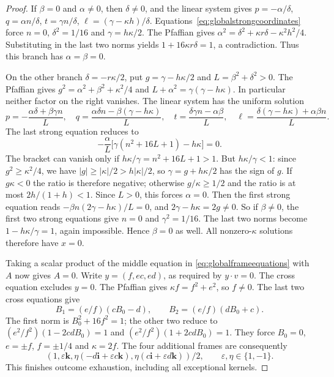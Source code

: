 \documentclass[11pt]{article}
\begin{document}
\begin{proof}
If $\beta=0$ and $\alpha\ne0$, then $\delta\ne0$, and the linear
system gives
$p=-\alpha/\delta$, $q=\alpha n/\delta$,
$t=\gamma n/\delta$, $\ell=(\gamma-\kappa h)/\delta$.
Equations~\eqref{eq:globalstrongcoordinates} force
$n=0$, $\delta^2=1/16$ and $\gamma=h\kappa/2$.
The Pfaffian gives
$\alpha^2=\delta^2+\kappa r\delta-\kappa^2h^2/4$.
Substituting in the last two norms yields $1+16\kappa r\delta=1$,
a contradiction. Thus this branch has $\alpha=\beta=0$.

On the other branch $\delta=-r\kappa/2$, put
$g=\gamma-h\kappa/2$ and $L=\beta^2+\delta^2>0$.
The Pfaffian gives
$g^2=\alpha^2+\beta^2+\kappa^2/4$ and
$L+\alpha^2=\gamma(\gamma-h\kappa)$.
In particular neither factor on the right vanishes. The linear system
has the uniform solution
\[
 p=-\frac{\alpha\delta+\beta\gamma n}{L},\quad
 q=\frac{\alpha\delta n-\beta(\gamma-h\kappa)}{L},\quad
 t=\frac{\delta\gamma n-\alpha\beta}{L},\quad
 \ell=\frac{\delta(\gamma-h\kappa)+\alpha\beta n}{L}.
\]
The last strong equation reduces to
\[
 -\frac{\alpha}{L}
 \bigl[\gamma(n^2+16L+1)-h\kappa\bigr]=0.
\]
The bracket can vanish only if $h\kappa/\gamma=n^2+16L+1>1$. But
$h\kappa/\gamma<1$: since $g^2\geq\kappa^2/4$, we have
$|g|\geq|\kappa|/2>h|\kappa|/2$, so $\gamma=g+h\kappa/2$ has the sign of
$g$. If $g\kappa<0$ the ratio is therefore negative; otherwise
$g/\kappa\geq1/2$ and the ratio is at most $2h/(1+h)<1$. Since $L>0$,
this forces $\alpha=0$. Then the first strong equation reads
$-\beta n(2\gamma-h\kappa)/L=0$, and $2\gamma-h\kappa=2g\neq0$. So if
$\beta\ne0$, the first two strong equations give $n=0$ and
$\gamma^2=1/16$. The last two norms become
$1-h\kappa/\gamma=1$, again impossible. Hence $\beta=0$ as well.
All nonzero-$\kappa$ solutions therefore have $x=0$.

Taking a scalar product of the middle equation in
\eqref{eq:globalframeequations} with $A$ now gives $A=0$.
Write $y=(f,ec,ed)$, as required by $y\cdot v=0$.
The cross equation excludes $y=0$. The Pfaffian gives
$\kappa f=f^2+e^2$, so $f\ne0$.
The last two cross equations give
\[
 B_1=(e/f)(cB_0-d),\qquad B_2=(e/f)(dB_0+c).
\]
The first norm is $B_0^2+16f^2=1$; the other two reduce to
$(e^2/f^2)(1-2cdB_0)=1$ and
$(e^2/f^2)(1+2cdB_0)=1$.
They force $B_0=0$, $e=\pm f$, $f=\pm1/4$ and $\kappa=2f$.
The four additional frames are consequently
\begin{equation}\label{eq:globalmixedfour}
 (1,\varepsilon\mathbf k,
 \eta(-d\mathbf i+\varepsilon c\mathbf k),
 \eta(c\mathbf i+\varepsilon d\mathbf k))/2,
 \qquad \varepsilon,\eta\in\{1,-1\}.
\end{equation}
This finishes outcome exhaustion, including all exceptional kernels.


\end{proof}
\end{document}
